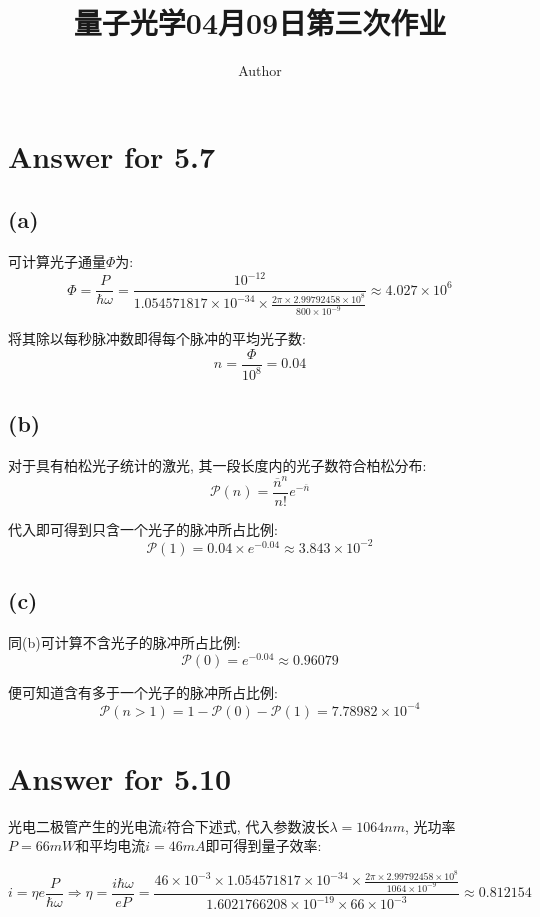 \documentclass[twoside]{article}
\begin{document}
\title{量子光学04月09日第三次作业}
\author{Author}
\pagestyle{fancy}
\makeatletter
\fancyhead[L]{\@title}
\fancyhead[R]{\@author}
\makeatother
\setlength{\parindent}{0pt}

\section*{Answer for 5.7}

\subsection*{(a)}

可计算光子通量$\Phi$为:
\begin{equation*}
    \Phi = \frac{P}{\hbar \omega} = \frac{10^{-12}}{1.054571817 \times 10^{-34} \times \frac{2\pi \times 2.99792458 \times 10^8}{800 \times 10^{-9}}} \approx 4.027 \times 10^6
\end{equation*}

将其除以每秒脉冲数即得每个脉冲的平均光子数:
$$n = \frac{\Phi}{10^{8}} = 0.04$$


\subsection*{(b)}

对于具有柏松光子统计的激光, 其一段长度内的光子数符合柏松分布:
$$\mathcal{P} (n) = \frac{\overline{n}^n}{n!} e^{-\overline{n}}$$

代入即可得到只含一个光子的脉冲所占比例:
$$\mathcal{P} (1) = 0.04 \times e^{-0.04} \approx 3.843 \times 10^{-2} $$

\subsection*{(c)}

同(b)可计算不含光子的脉冲所占比例:
$$\mathcal{P} (0) = e^{-0.04} \approx 0.96079 $$

便可知道含有多于一个光子的脉冲所占比例:
$$\mathcal{P}(n > 1) = 1 - \mathcal{P}(0) - \mathcal{P} (1) = 7.78982 \times 10^{-4}$$


\section*{Answer for 5.10}

光电二极管产生的光电流$i$符合下述式, 代入参数波长$\lambda = 1064 nm$, 光功率$P = 66mW$和平均电流$i = 46mA$即可得到量子效率:

$$ i = \eta e \frac{P}{\hbar \omega}  \Rightarrow \eta = \frac{i \hbar \omega}{e P} = \frac{46 \times 10^{-3} \times 1.054571817\times 10^{-34} \times \frac{2\pi \times 2.99792458 \times 10^8}{1064 \times 10^{-9}}}{1.6021766208 \times 10^{-19} \times 66 \times 10^{-3}} \approx 0.812154$$
\end{document}

